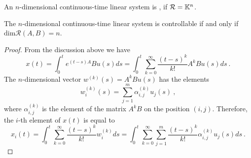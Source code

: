 \begin{definition}
	An $n$-dimensional continuous-time linear system is , if $\mathcal{R}=\mathbb{K}^n$.
\end{definition}

\begin{theorem}
	The $n$-dimensional continuous-time linear system is controllable if and only if $\text{dim}\mathcal{R}(A,B)=n$.
\end{theorem}

\begin{proof}
	From the discussion above we have 
	$$
		x(t)=\int^t_0e^{(t-s)A}Bu(s)ds
		=\int^t_0\sum^\infty_{k=0}\frac{(t-s)^k}{k!}A^kBu(s)ds\ .
	$$
	The $n$-dimensional vector $w^{(k)}(s)=A^kBu(s)$ has the elements
	$$w^{(k)}_i(s)=\sum^m_{j=1}\alpha^{(k)}_{i,j}u_j(s)\ ,$$
	where $\alpha^{(k)}_{i,j}$ is the element of the matrix $A^kB$ on the position $(i,j)$. Therefore, the $i$-th element of $x(t)$ is equal to
	$$
		x_i(t)
		=\int^t_0\sum^\infty_{k=0}\frac{(t-s)^k}{k!}w^{(k)}_ids
		=\int^t_0\sum^\infty_{k=0}\sum^m_{j=1}\frac{(t-s)^k}{k!}\alpha^{(k)}_{i,j}u_j(s)ds\ .
	$$
	

\end{proof}
